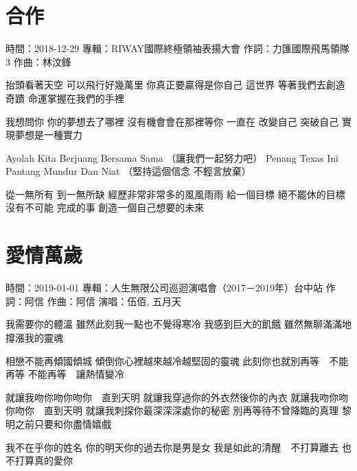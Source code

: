 \documentclass[UTF8,a4paper,oneside,twocolumn,12pt]{ctexbook}
\newcommand{\infopair}[2]{\textbullet #1：#2}
\newcommand{\zc}[1][伍佰]{\infopair{作詞}{#1}}
\newcommand{\zq}[1][伍佰]{\infopair{作曲}{#1}}
\newcommand{\zj}[1]{\infopair{專輯}{#1}}
\newcommand{\sj}[1]{\infopair{時間}{#1}}
\newenvironment{info}{\begin{flushleft}\kaishu
	}
	{\end{flushleft}\normalsize\yahei\par}
\newenvironment{lyric}{
	}
{}
\begin{document}
\section{合作} %
\begin{info}
	\sj{2018-12-29}
	\zj{RIWAY國際終極領袖表揚大會}
	\zc[力匯國際飛馬領隊3]
	\zq[林汶鋒]
\end{info}
\begin{lyric}
	抬頭看著天空 可以飛行好幾萬里
	你真正要贏得是你自己
	這世界 等著我們去創造奇蹟
	命運掌握在我們的手裡

	我想問你 你的夢想去了哪裡
	沒有機會會在那裡等你
	一直在 改變自己 突破自己
	實現夢想是一種實力

	Ayolah Kita Berjuang Bersama Sama
	（讓我們一起努力吧）
	Penang Texas Ini Pantang Mundur Dan Niat
	（堅持這個信念 不輕言放棄）

	從一無所有 到一無所缺
	經歷非常非常多的風風雨雨
	給一個目標 絕不罷休的目標
	沒有不可能 完成的事
	創造一個自己想要的未來
\end{lyric}

\section{愛情萬歲} %
\begin{info}
	\sj{2019-01-01}
	\zj{人生無限公司巡迴演唱會（2017－2019年）台中站}
	\zc[阿信]
	\zq[阿信]
	\infopair{演唱}{伍佰, 五月天}
\end{info}
\begin{lyric}
	我需要你的體溫
	雖然此刻我一點也不覺得寒冷
	我感到巨大的飢餓
	雖然無聊滿滿地撐漲我的靈魂

	相戀不能再傾國傾城
	傾倒你心裡越來越冷越堅固的靈魂
	此刻你也就別再等　不能再等
	不能再等　讓熱情變冷

	就讓我吻你吻你吻你　直到天明
	就讓我穿過你的外衣然後你的內衣
	就讓我吻你吻你吻你　直到天明
	就讓我刺探你最深深深處你的秘密
	別再等待不曾降臨的真理
	黎明之前只要和你盡情嬉戲

	我不在乎你的姓名
	你的明天你的過去你是男是女
	我是如此的清醒　不打算離去
	也不打算真的愛你
\end{lyric}
\end{document}
